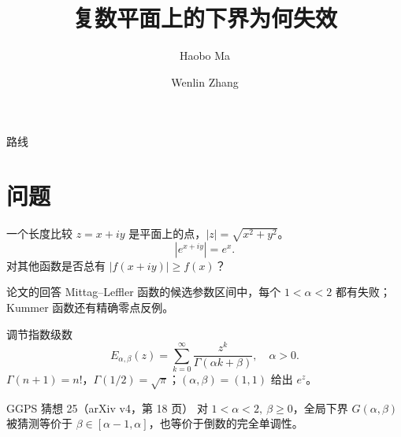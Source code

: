 \documentclass{beamer}
\title{复数平面上的下界为何失效}
\author{Haobo Ma \and Wenlin Zhang}
\begin{document}
\begin{frame}
\titlepage
{}
\end{frame}
\begin{frame}{路线}
\tableofcontents
{}
\end{frame}
\section{问题}
\begin{frame}{一个长度比较}
$z=x+iy$ 是平面上的点，$|z|=\sqrt{x^2+y^2}$。
\[
|e^{x+iy}|=e^x.
\]
对其他函数是否总有 $|f(x+iy)|\ge f(x)$？
\begin{alertblock}{论文的回答}
Mittag--Leffler 函数的候选参数区间中，每个 $1{<} \alpha{<} 2$ 都有失败；Kummer 函数还有精确零点反例。
\end{alertblock}
\end{frame}
\begin{frame}{调节指数级数}
\[
E_{\alpha,\beta}(z)=\sum_{k=0}^{\infty}\frac{z^k}{\Gamma(\alpha k+\beta)},\quad\alpha>0.
\]
$\Gamma(n+1)=n!$，$\Gamma(1/2)=\sqrt\pi$；$(\alpha,\beta)=(1,1)$ 给出 $e^z$。
\begin{block}{GGPS 猜想 25（arXiv v4，第 18 页）}
对 $1{<} \alpha{<} 2,\ \beta\ge0$，全局下界 $G(\alpha,\beta)$ 被猜测等价于 $\beta\in[\alpha-1,\alpha]$，也等价于倒数的完全单调性。
\end{block}
\end{frame}
\end{document}
